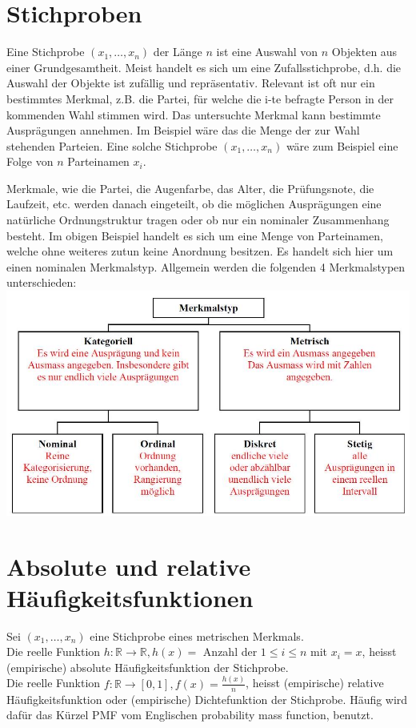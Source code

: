 \documentclass[10pt]{article}
\begin{document}
\section*{Stichproben}
Eine Stichprobe $\left(x_{1}, \ldots, x_{n}\right)$ der Länge $n$ ist eine Auswahl von $n$ Objekten aus einer Grundgesamtheit. Meist handelt es sich um eine Zufallsstichprobe, d.h. die Auswahl der Objekte ist zufällig und repräsentativ. Relevant ist oft nur ein bestimmtes Merkmal, z.B. die Partei, für welche die i-te befragte Person in der kommenden Wahl stimmen wird. Das untersuchte Merkmal kann bestimmte Ausprägungen annehmen. Im Beispiel wäre das die Menge der zur Wahl stehenden Parteien. Eine solche Stichprobe $\left(x_{1}, \ldots, x_{n}\right)$ wäre zum Beispiel eine Folge von $n$ Parteinamen $x_{i}$.

Merkmale, wie die Partei, die Augenfarbe, das Alter, die Prüfungsnote, die Laufzeit, etc. werden danach eingeteilt, ob die möglichen Ausprägungen eine natürliche Ordnungstruktur tragen oder ob nur ein nominaler Zusammenhang besteht. Im obigen Beispiel handelt es sich um eine Menge von Parteinamen, welche ohne weiteres zutun keine Anordnung besitzen. Es handelt sich hier um einen nominalen Merkmalstyp. Allgemein werden die folgenden 4 Merkmalstypen unterschieden:\\
\includegraphics[width=\linewidth]{images/2025_01_02_7223f4748d9c61c6ce42g-1(2)}

\section*{Absolute und relative Häufigkeitsfunktionen}
Sei $\left(x_{1}, \ldots, x_{n}\right)$ eine Stichprobe eines metrischen Merkmals.\\
Die reelle Funktion $h: \mathbb{R} \rightarrow \mathbb{R}, h(x)=$ Anzahl der $1 \leq i \leq n$ mit $x_{i}=x$, heisst (empirische) absolute Häufigkeitsfunktion der Stichprobe.\\
Die reelle Funktion $f: \mathbb{R} \rightarrow[0,1], f(x)=\frac{h(x)}{n}$, heisst (empirische) relative Häufigkeitsfunktion oder (empirische) Dichtefunktion der Stichprobe. Häufig wird dafür das Kürzel PMF vom Englischen probability mass function, benutzt.
\end{document}
